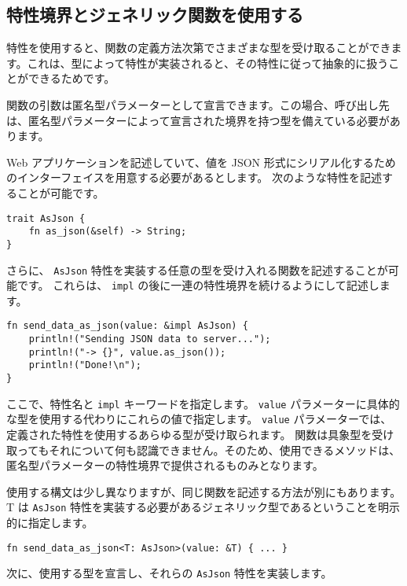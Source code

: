 \subsection{特性境界とジェネリック関数を使用する}

特性を使用すると、関数の定義方法次第でさまざまな型を受け取ることができます。これは、型によって特性が実装されると、その特性に従って抽象的に扱うことができるためです。

関数の引数は匿名型パラメーターとして宣言できます。この場合、呼び出し先は、匿名型パラメーターによって宣言された境界を持つ型を備えている必要があります。

Web アプリケーションを記述していて、値を JSON 形式にシリアル化するためのインターフェイスを用意する必要があるとします。 次のような特性を記述することが可能です。


\begin{lstlisting}[numbers=none]
trait AsJson {
    fn as_json(&self) -> String;
}
\end{lstlisting}

さらに、 \texttt{AsJson} 特性を実装する任意の型を受け入れる関数を記述することが可能です。 これらは、 \texttt{impl} の後に一連の特性境界を続けるようにして記述します。

\begin{lstlisting}[numbers=none]
fn send_data_as_json(value: &impl AsJson) {
    println!("Sending JSON data to server...");
    println!("-> {}", value.as_json());
    println!("Done!\n");
}
\end{lstlisting}

ここで、特性名と \texttt{impl} キーワードを指定します。 \texttt{value} パラメーターに具体的な型を使用する代わりにこれらの値で指定します。 \texttt{value} パラメーターでは、定義された特性を使用するあらゆる型が受け取られます。 関数は具象型を受け取ってもそれについて何も認識できません。そのため、使用できるメソッドは、匿名型パラメーターの特性境界で提供されるものみとなります。

使用する構文は少し異なりますが、同じ関数を記述する方法が別にもあります。T は \texttt{AsJson} 特性を実装する必要があるジェネリック型であるということを明示的に指定します。


\begin{lstlisting}[numbers=none]
fn send_data_as_json<T: AsJson>(value: &T) { ... }
\end{lstlisting}

次に、使用する型を宣言し、それらの \texttt{AsJson} 特性を実装します。


